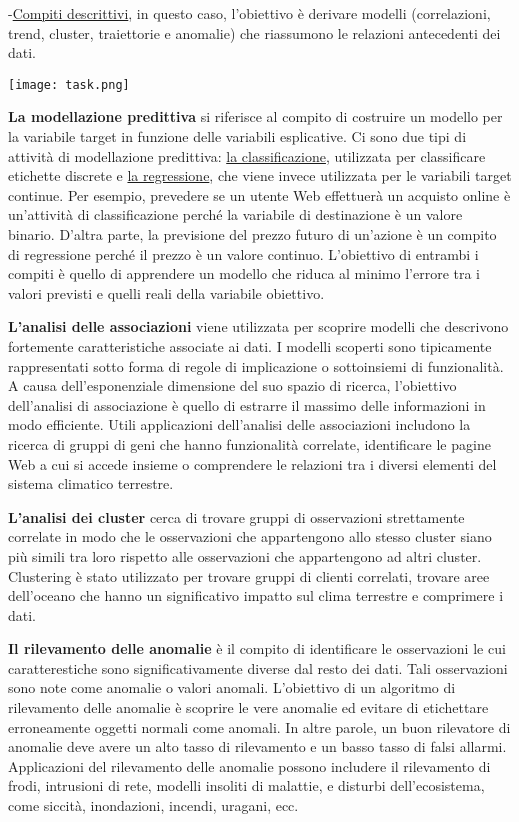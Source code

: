 -\underline{Compiti descrittivi}, in questo caso, l'obiettivo è derivare modelli (correlazioni, trend, cluster, traiettorie e anomalie) che riassumono le
relazioni antecedenti dei dati.

\texttt{[image: task.png]}


\textbf{La modellazione predittiva} si riferisce al compito di costruire un modello per la variabile target
in funzione delle variabili esplicative. Ci sono due tipi di attività di modellazione predittiva: \underline{la classificazione}, utilizzata per classificare etichette discrete
 e \underline{la regressione}, che viene invece utilizzata per le variabili target continue. Per
esempio, prevedere se un utente Web effettuerà un acquisto online è un'attività di classificazione perché la variabile di destinazione è un valore binario.
D'altra parte, la previsione del prezzo futuro di un'azione è un compito di regressione
perché il prezzo è un valore continuo. L'obiettivo di entrambi i compiti è quello di
apprendere un modello che riduca al minimo l'errore tra i valori previsti e quelli reali
della variabile obiettivo.


\textbf{L'analisi delle associazioni} viene utilizzata per scoprire modelli che descrivono fortemente
caratteristiche associate ai dati. I modelli scoperti sono tipicamente rappresentati
sotto forma di regole di implicazione o sottoinsiemi di funzionalità. A causa dell'esponenziale
dimensione del suo spazio di ricerca, l'obiettivo dell'analisi di associazione è quello di estrarre il massimo
delle informazioni in modo efficiente. Utili applicazioni dell'analisi  delle associazioni
 includono la ricerca di gruppi di geni che hanno funzionalità correlate, identificare le pagine Web a cui si accede insieme o comprendere le relazioni
tra i diversi elementi del sistema climatico terrestre.



\textbf{L'analisi dei cluster} cerca di trovare gruppi di osservazioni strettamente correlate in modo che
le osservazioni che appartengono allo stesso cluster siano più simili tra loro
rispetto alle osservazioni che appartengono ad altri cluster. Clustering è stato utilizzato per
trovare gruppi di clienti correlati, trovare aree dell'oceano che hanno un significativo
impatto sul clima terrestre e comprimere i dati.



\textbf{Il rilevamento delle anomalie} è il compito di identificare le osservazioni le cui caratterestiche sono significativamente diverse dal resto dei dati. 
Tali osservazioni sono note come anomalie o valori anomali. L'obiettivo di un algoritmo di rilevamento delle anomalie
è scoprire le vere anomalie ed evitare di etichettare erroneamente oggetti normali come anomali. In altre parole, un buon rilevatore di anomalie deve avere un alto
tasso di rilevamento e un basso tasso di falsi allarmi. Applicazioni del rilevamento delle anomalie possono
includere il rilevamento di frodi, intrusioni di rete, modelli insoliti di malattie,
e disturbi dell'ecosistema, come siccità, inondazioni, incendi, uragani, ecc.
